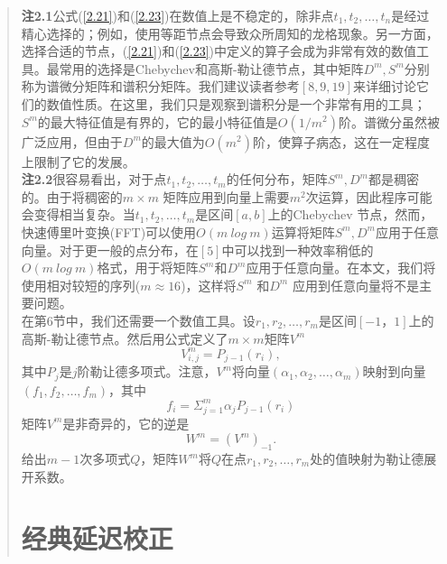 \documentclass{article}
\begin{document}
\begin{CJK}{UTF8}{gkai}
\begin{quotation}
\textbf{注2.1}公式(\ref{2.21})和(\ref{2.23})在数值上是不稳定的，除非点$t_1,t_2,\ldots,t_n$是经过精心选择的；例如，使用等距节点会导致众所周知的龙格现象。另一方面，选择合适的节点，(\ref{2.21})和(\ref{2.23})中定义的算子会成为非常有效的数值工具。最常用的选择是Chebychev和高斯-勒让德节点，其中矩阵$D^m,S^m$分别称为谱微分矩阵和谱积分矩阵。我们建议读者参考$[8,9,19]$来详细讨论它们的数值性质。在这里，我们只是观察到谱积分是一个非常有用的工具；$S^m$的最大特征值是有界的，它的最小特征值是$O(1/m^2)$阶。谱微分虽然被广泛应用，但由于$D^m$的最大值为$O(m^2)$阶，使算子病态，这在一定程度上限制了它的发展。\\

\textbf{注2.2}很容易看出，对于点$t_1,t_2,\ldots,t_m$的任何分布，矩阵$S^m,D^m$都是稠密的。由于将稠密的$m \times m$ 矩阵应用到向量上需要$m^2$次运算，因此程序可能会变得相当复杂。当$t_1,t_2,\ldots,t_m$是区间$[a, b]$上的Chebychev 节点，然而，快速傅里叶变换(FFT)可以使用$O(m~log~m)$运算将矩阵$S^m, D^m$应用于任意向量。对于更一般的点分布，在$[5]$中可以找到一种效率稍低的$O(m~log~m)$格式，用于将矩阵$S^m$和$D^m$应用于任意向量。在本文，我们将使用相对较短的序列($m\approx 16$)，这样将$S^m$ 和$D^m$ 应用到任意向量将不是主要问题。\\

在第$6$节中，我们还需要一个数值工具。设$r_1,r_2,\ldots,r_m$是区间$[-1，1]$上的高斯-勒让德节点。然后用公式定义了$m \times m$矩阵$V^m$\\
\begin{equation}
V_{i,j}^{m}=P_{j-1}(r_i),
\end{equation}
其中$P_j$是$j$阶勒让德多项式。注意，$V^m$将向量$(\alpha_1,\alpha_2,\ldots,\alpha_m)$映射到向量$(f_1,f_2,\ldots,f_m)$，其中\\
$$ f_i=\Sigma_{j=1}^{m} \alpha_j P_{j-1}(r_i)$$
矩阵$V^m$是非奇异的，它的逆是\\
\begin{equation}
W^m=(V^m)_{-1}.
\label{2.26}
\end{equation}
给出$m-1$次多项式$Q$，矩阵$W^m$将$Q$在点$r_1,r_2,\ldots,r_m$处的值映射为勒让德展开系数。\\
\section{经典延迟校正}


\end{quotation}
\end{CJK}
\end{document}
